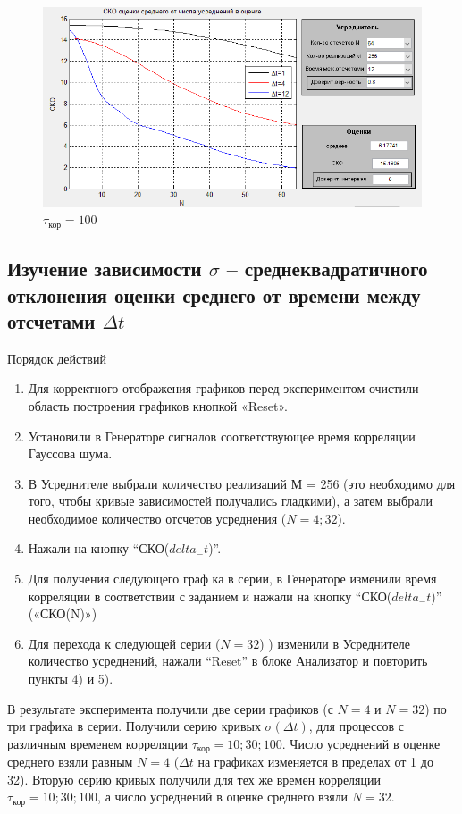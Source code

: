 \begin{figure}[H]
	\centering
    \includegraphics[width=0.85\linewidth]{fig/fig32}
	\caption*{$\tau_\text{кор} = 100$}
\end{figure}
\subsection[Задание 4]{Изучение зависимости $\sigma$ -- среднеквадратичного отклонения оценки среднего от времени между отсчетами $\Delta t$}
Порядок действий
\begin{enumerate}
	\item Для корректного отображения графиков перед экспериментом очистили область построения графиков кнопкой «Reset».
	\item Установили в Генераторе сигналов соответствующее время корреляции Гауссова шума.
	\item В Усреднителе выбрали количество реализаций М = 256 (это необходимо для того, чтобы кривые зависимостей получались гладкими), а затем выбрали необходимое количество отсчетов усреднения ($N = 4; 32$).
	\item Нажали на кнопку “СКО($delta_{-}t$)”.
	\item Для получения следующего граф ка в серии, в Генераторе изменили время корреляции в соответствии с заданием и нажали на кнопку “СКО($delta_{-}t$)” («СКО(N)»)
	\item Для перехода к следующей серии ($N=32$) ) изменили в Усреднителе количество усреднений, нажали “Reset” в блоке Анализатор и повторить пункты 4) и 5).
\end{enumerate}
В результате эксперимента получили две серии графиков (с $N = 4$ и $N = 32$) по три графика в серии.
Получили серию кривых $\sigma(\Delta t)$, для процессов с различным временем корреляции $\tau_\text{кор}= 10; 30; 100$. Число усреднений в оценке среднего взяли равным $N = 4$ ($\Delta t$ на графиках изменяется в пределах от 1 до 32).
Вторую серию кривых получили для тех же времен корреляции $\tau_\text{кор}= 10; 30; 100$, а число усреднений в оценке среднего взяли $N = 32$.

